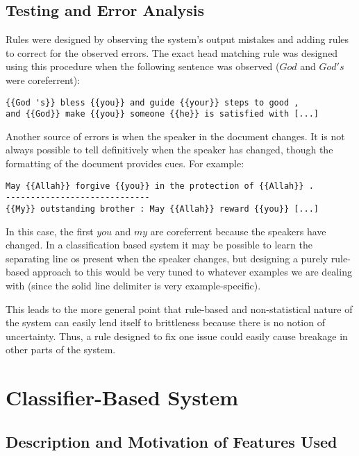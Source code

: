 \documentclass[12pt,a4paper]{article}
\begin{document}
\subsection{Testing and Error Analysis}

Rules were designed by observing the system's output mistakes and adding rules to correct for the observed errors.  The exact head matching rule was designed using this procedure when the following sentence was observed ($God$ and $God's$ were coreferrent): 

\begin{lstlisting}[frame=single, backgroundcolor=\color{light-gray}]
{{God 's}} bless {{you}} and guide {{your}} steps to good , 
and {{God}} make {{you}} someone {{he}} is satisfied with [...]
\end{lstlisting}

Another source of errors is when the speaker in the document changes.  It is not always possible to tell definitively when the speaker has changed, though the formatting of the document provides cues.  For example:

\begin{lstlisting}[frame=single, backgroundcolor=\color{light-gray}]
May {{Allah}} forgive {{you}} in the protection of {{Allah}} . 
----------------------------- 
{{My}} outstanding brother : May {{Allah}} reward {{you}} [...]
\end{lstlisting}

In this case, the first $you$ and $my$ are coreferrent because the speakers have changed.  In a classification based system it may be possible to learn the separating line os present when the speaker changes, but designing a purely rule-based approach to this would be very tuned to whatever examples we are dealing with (since the solid line delimiter is very example-specific).

This leads to the more general point that rule-based and non-statistical nature of the system can easily lend itself to brittleness because there is no notion of uncertainty.  Thus, a rule designed to fix one issue could easily cause breakage in other parts of the system. 

\section{Classifier-Based System}

\subsection{Description and Motivation of Features Used}
\end{document}
